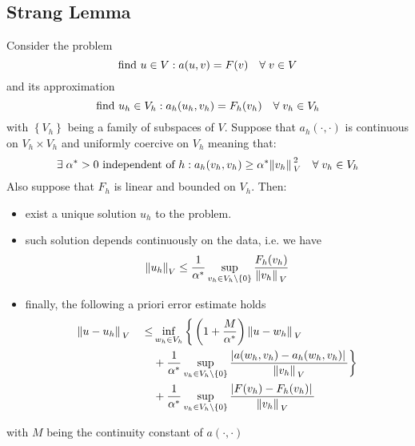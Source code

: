 \subsection{Strang Lemma}
\begin{lemma}
Consider the problem
\begin{equation}
    \text{find } u \in V: a(u,v) = F(v) \quad \forall \; v \in V
    \label{another_weak_formulation}
\end{equation}
and its approximation 
\begin{equation}
    \text{find } u_h \in V_h: a_h(u_h,v_h) = F_h(v_h) \quad \forall \; v_h \in V_h
    \label{another_weak_approximation}
\end{equation}
with \(\left\{V_h\right\}\) being a family of subspaces of \(V\). Suppose that \(a_h(\cdot,\cdot)\) is continuous on \(V_h \times V_h\) and uniformly coercive on \(V_h\) meaning that:
\[
    \exists \; \alpha^* > 0 \text{ independent of }h : a_h(v_h, v_h) \geq \alpha^* \norm*{v_h}^2_V \quad \forall \; v_h \in V_h
\]
Also suppose that \(F_h\) is linear and bounded on \(V_h\). Then:
\begin{itemize}
    \item exist a unique solution \(u_h\) to the problem.
    \item such solution depends continuously on the data, i.e. we have 
    \[
        \norm{u_h}_V \leq \frac{1}{\alpha^*} \sup_{v_h \in V_h \backslash \left\{0\right\}} \frac{F_h(v_h)}{\norm*{v_h}_V}
    \]
    \item  finally, the following a priori error estimate holds 
    \begin{align*}
        \norm*{u-u_h}_V \quad \leq & \inf_{w_h \in V_h} \bigg\{\left(1+\frac{M}{\alpha^*}\right) \norm*{u-w_h}_V \\
        &+ \frac{1}{\alpha^*} \sup_{v_h \in V_h \backslash \left\{0\right\}} \frac{\abs*{a(w_h, v_h) - a_h(w_h, v_h)}}{\norm*{v_h}_V} \bigg\} \\
        &+ \frac{1}{\alpha^*} \sup_{v_h \in V_h \backslash \left\{0\right\}} \frac{\abs*{F(v_h)-F_h(v_h)}}{\norm*{v_h}_V} 
    \end{align*}
\end{itemize}
with \(M\) being the continuity constant of \(a(\cdot, \cdot)\)
\end{lemma}
